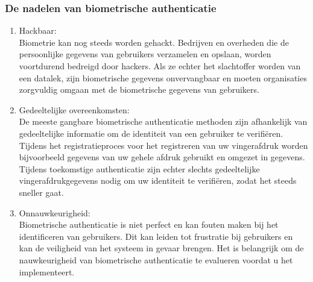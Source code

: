   \subsubsection{De nadelen van biometrische authenticatie}%
  \label{subsubsec:de-nadelen-van-biometrische-authenticatie}
  \begin{enumerate}[label=\textbf{-}]
    \item Hackbaar: \\
    Biometrie kan nog steeds worden gehackt. Bedrijven en overheden die de persoonlijke gegevens van gebruikers verzamelen en opslaan, worden voortdurend bedreigd door hackers. Als ze echter het slachtoffer worden van een datalek, zijn biometrische gegevens onvervangbaar en moeten organisaties zorgvuldig omgaan met de biometrische gegevens van gebruikers.
  
    \item Gedeeltelijke overeenkomsten: \\
    De meeste gangbare biometrische authenticatie methoden zijn afhankelijk van gedeeltelijke informatie om de identiteit van een gebruiker te verifiëren. Tijdens het registratieproces voor het registreren van uw vingerafdruk worden bijvoorbeeld gegevens van uw gehele afdruk gebruikt en omgezet in gegevens. Tijdens toekomstige authenticatie zijn echter slechts gedeeltelijke vingerafdrukgegevens nodig om uw identiteit te verifiëren, zodat het steeds sneller gaat.
  
    \item Onnauwkeurigheid: \\
    Biometrische authenticatie is niet perfect en kan fouten maken bij het identificeren van gebruikers. Dit kan leiden tot frustratie bij gebruikers en kan de veiligheid van het systeem in gevaar brengen. Het is belangrijk om de nauwkeurigheid van biometrische authenticatie te evalueren voordat u het implementeert.
  \end{enumerate}



